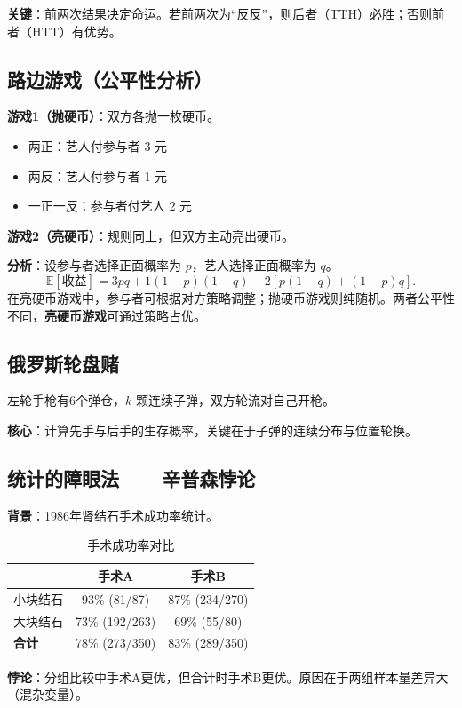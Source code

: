 \documentclass[11pt,a4paper]{report}
\theoremstyle{definition}
\newcommand{\E}{\mathbb{E}}
\begin{document}
\textbf{关键}：前两次结果决定命运。若前两次为``反反''，则后者（TTH）必胜；否则前者（HTT）有优势。

\subsection{路边游戏（公平性分析）}
\textbf{游戏1（抛硬币）}：双方各抛一枚硬币。
\begin{itemize}[leftmargin=2em]
    \item 两正：艺人付参与者 3 元
    \item 两反：艺人付参与者 1 元
    \item 一正一反：参与者付艺人 2 元
\end{itemize}

\textbf{游戏2（亮硬币）}：规则同上，但双方主动亮出硬币。

\textbf{分析}：设参与者选择正面概率为 $p$，艺人选择正面概率为 $q$。
\[
\E[\text{收益}] = 3pq + 1(1-p)(1-q) - 2[p(1-q)+(1-p)q].
\]
在亮硬币游戏中，参与者可根据对方策略调整；抛硬币游戏则纯随机。两者公平性不同，\textbf{亮硬币游戏}可通过策略占优。

\subsection{俄罗斯轮盘赌}
左轮手枪有6个弹仓，$k$ 颗连续子弹，双方轮流对自己开枪。

\textbf{核心}：计算先手与后手的生存概率，关键在于子弹的连续分布与位置轮换。

\subsection{统计的障眼法——辛普森悖论}
\textbf{背景}：1986年肾结石手术成功率统计。

\begin{table}[htbp]
\centering
\caption{手术成功率对比}
\begin{tabular}{@{}lcc@{}}
\toprule
& \textbf{手术A} & \textbf{手术B} \\
\midrule
小块结石 & 93\% (81/87) & 87\% (234/270) \\
大块结石 & 73\% (192/263) & 69\% (55/80) \\
\midrule
\textbf{合计} & 78\% (273/350) & 83\% (289/350) \\
\bottomrule
\end{tabular}
\end{table}

\textbf{悖论}：分组比较中手术A更优，但合计时手术B更优。原因在于两组样本量差异大（混杂变量）。
\end{document}
